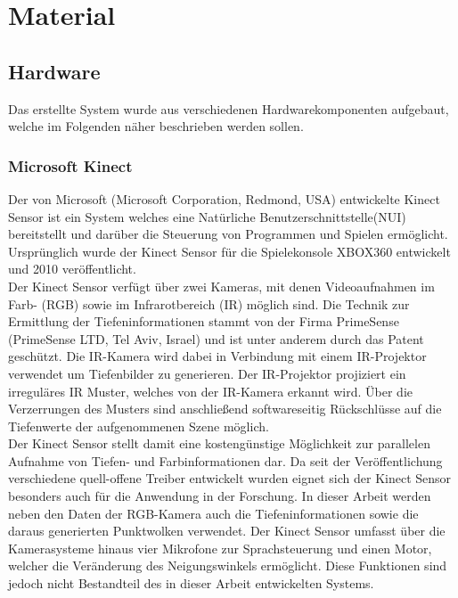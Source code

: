 \chapter{Material}
\label{chap:material}

\section{Hardware}
Das erstellte System wurde aus verschiedenen Hardwarekomponenten aufgebaut, welche im Folgenden näher beschrieben werden sollen. 

\subsection{Microsoft Kinect}
Der von Microsoft (Microsoft Corporation, Redmond, USA) entwickelte Kinect Sensor ist ein System welches eine Natürliche Benutzerschnittstelle\red[Definition] (NUI) bereitstellt und darüber die Steuerung von Programmen und Spielen ermöglicht. Ursprünglich wurde der Kinect Sensor für die Spielekonsole XBOX360 entwickelt und 2010 veröffentlicht.\\
Der Kinect Sensor verfügt über zwei Kameras, mit denen Videoaufnahmen im Farb- (RGB) sowie im Infrarotbereich (IR) möglich sind. Die Technik zur Ermittlung der Tiefeninformationen stammt von der Firma PrimeSense (PrimeSense LTD, Tel Aviv, Israel) und ist unter anderem durch das Patent \cite{Freedman2008} geschützt. Die IR-Kamera wird dabei in Verbindung mit einem IR-Projektor verwendet um Tiefenbilder zu generieren. Der IR-Projektor projiziert ein irreguläres IR Muster, welches von der IR-Kamera erkannt wird. Über die Verzerrungen des Musters sind anschließend softwareseitig Rückschlüsse auf die Tiefenwerte der aufgenommenen Szene möglich.\\
Der Kinect Sensor stellt damit eine kostengünstige Möglichkeit zur parallelen Aufnahme von Tiefen- und Farbinformationen dar. Da seit der Veröffentlichung verschiedene quell-offene Treiber entwickelt wurden eignet sich der Kinect Sensor besonders auch für die Anwendung in der Forschung. In dieser Arbeit werden neben den Daten der RGB-Kamera auch die Tiefeninformationen sowie die daraus generierten Punktwolken verwendet. Der Kinect Sensor umfasst über die Kamerasysteme hinaus vier Mikrofone zur Sprachsteuerung und einen Motor, welcher die Veränderung des Neigungswinkels ermöglicht. Diese Funktionen sind jedoch nicht Bestandteil des in dieser Arbeit entwickelten Systems.\\

